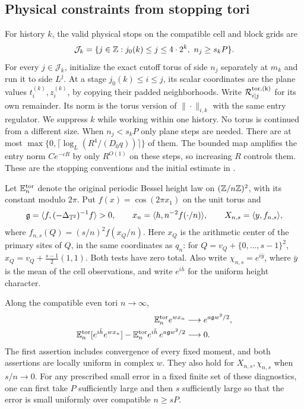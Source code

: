 \subsection{Physical constraints from stopping tori}

For history \(k\), the valid physical stops on the compatible cell and
block grids are
\begin{equation}\label{trj:valid-stops}
 \mathcal J_k=\{j\in\mathbb Z:j_0(k)\le j\le4\cdot2^k,\ n_j\ge s_kP\}.
\end{equation}
For every \(j\in\mathcal J_k\), initialize the exact cutoff torus of
side \(n_j\) separately at \(m_k\) and run it to side \(L^j\).
At a stage \(j_0(k)\le i\le j\), its scalar coordinates are the plane
values \(t_i^{(k)},z_i^{(k)}\), by copying their padded neighborhoods.
Write \(\mathcal R_{i|j}^{\rm tor,(k)}\) for its own remainder.
Its norm is the torus version of \(\|\cdot\|_{i,k}\) with the same
entry regulator.  We suppress \(k\) while working within one history.
No torus is continued from a different size.  When \(n_j<s_kP\) only
plane steps are needed.
There are at most
\(\max\{0,\lceil\log_L(R^4/(D_0q))\rceil\}\) of them.  The bounded
map amplifies the entry norm \(Ce^{-cR}\) by only \(R^{O(1)}\) on
these steps, so increasing \(R\) controls them.  These are the stopping
conventions and the initial estimate in \cite[Section~10.1]{B}.

Let \(\mathbb E_n^{\rm tor}\) denote the original periodic Bessel height law
on \((\mathbb Z/n\mathbb Z)^2\), with its constant modulo \(2\pi\).  Put
\(f(x)=\cos(2\pi x_1)\) on the unit torus and
\begin{equation}\label{trj:probes}
 \mathfrak g=\langle f,(-\Delta_{\mathbb T^2})^{-1}f\rangle>0,\qquad
 x_n=\langle h,n^{-2}f(\cdot/n)\rangle,\qquad
 X_{n,s}=\langle y,f_{n,s}\rangle,
\end{equation}
where \(f_{n,s}(Q)=(s/n)^2 f(x_Q/n)\).  Here \(x_Q\) is the arithmetic
center of the primary sites of \(Q\), in the same coordinates as
\(q_n\): for \(Q=v_Q+\{0,\ldots,s-1\}^2\),
\(x_Q=v_Q+\tfrac{s-1}{2}(1,1)\).  Both tests have zero total.  Also write
\(\chi_{n,s}=e^{i\bar y}\), where \(\bar y\) is the mean of the cell
observations, and write \(e^{i\bar h}\) for the uniform height character.

\begin{lemma}\label{trj:physical-torus}
Along the compatible even tori \(n\to\infty\),
\begin{align}
 \mathbb E_n^{\rm tor}e^{w x_n}&\longrightarrow
                  e^{a\mathfrak g w^2/2},\label{trj:torus-laplace}\\
 \mathbb E_n^{\rm tor}[e^{i\bar h}e^{w x_n}]
   -\mathbb E_n^{\rm tor}e^{i\bar h}\,e^{a\mathfrak g w^2/2}
       &\longrightarrow0.\label{trj:torus-factorization}
\end{align}
The first assertion includes convergence of every fixed moment, and
both assertions are locally uniform in complex \(w\).  They also hold
for \(X_{n,s},\chi_{n,s}\) when \(s/n\to0\).  For any prescribed small
error in a fixed finite set of these diagnostics, one can first take
\(P\) sufficiently large and then \(s\) sufficiently large so that
the error is small uniformly over compatible \(n\ge sP\).
\end{lemma}

